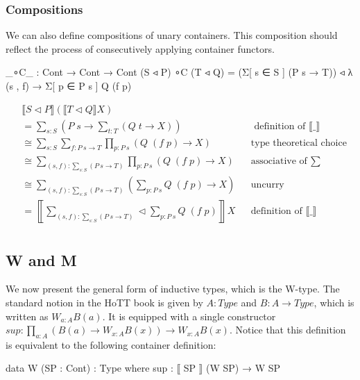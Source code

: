 \subsubsection*{Compositions}

We can also define compositions of unary containers. This composition should reflect the process of consecutively applying container functors.

\begin{code}
_∘C_ : Cont → Cont → Cont
(S ◃ P) ∘C (T ◃ Q) = (Σ[ s ∈ S ] (P s → T)) ◃ λ (s , f) → Σ[ p ∈ P s ] Q (f p)
\end{code}

\begin{align*}
& \llbracket S \triangleleft P \rrbracket (\llbracket T \triangleleft Q \rrbracket X) \\
&= \sum_{s : S} \left( P \; s \to \sum_{t : T} (Q \; t \to X) \right) && \text{ definition of $\llbracket \_ \rrbracket$} \\
&\cong \sum_{s : S} \sum_{f : P \: s \to T} \prod_{p : P \: s} (Q \; (f \; p) \to X) && \text{type theoretical choice} \\
&\cong \sum_{(s , f) : \sum_{s : S} ( P \: s \to T )} \prod_{p : P \: s} (Q \; (f \; p) \to X) && \text{associative of $\sum$} \\
&\cong \sum_{(s , f) : \sum_{s : S} ( P \: s \to T )} \left( \sum_{p : P \: s} Q \; (f \; p) \to X \right) && \text{uncurry} \\
&= \left\llbracket \sum_{(s , f) : \sum_{s : S} ( P \: s \to T )} \triangleleft \sum_{p : P \: s} Q \; (f \; p) \right\rrbracket X && \text{definition of $\llbracket \_ \rrbracket$} \\
\end{align*}

\subsection{W and M}

We now present the general form of inductive types, which is the W-type. The standard notion in the HoTT book is given by $A : Type$ and $B : A \to Type$, which is written as $W_{a : A} B (a)$. It is equipped with a single constructor $sup : \prod_{a : A} (B (a) \to W_{x : A} B (x)) \to W_{x : A} B (x)$. Notice that this definition is equivalent to the following container definition:

\begin{code}
data W (SP : Cont) : Type where
  sup : ⟦ SP ⟧ (W SP) → W SP
\end{code}

